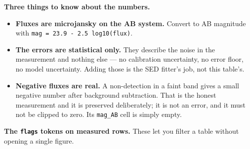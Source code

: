 \documentclass[11pt]{article}
\begin{document}
\textbf{Three things to know about the numbers.}

\begin{itemize}
  \item \textbf{Fluxes are microjansky on the AB system.} Convert to AB
        magnitude with \texttt{mag = 23.9 - 2.5 log10(flux)}.
  \item \textbf{The errors are statistical only.} They describe the noise
        in the measurement and nothing else --- no calibration
        uncertainty, no error floor, no model uncertainty. Adding those is
        the SED fitter's job, not this table's.
  \item \textbf{Negative fluxes are real.} A non-detection in a faint band
        gives a small negative number after background subtraction. That
        is the honest measurement and it is preserved deliberately; it is
        not an error, and it must not be clipped to zero. Its
        \texttt{mag\_AB} cell is simply empty.
\end{itemize}

\textbf{The \texttt{flags} tokens on measured rows.} These let you filter a
table without opening a single figure.
\end{document}
